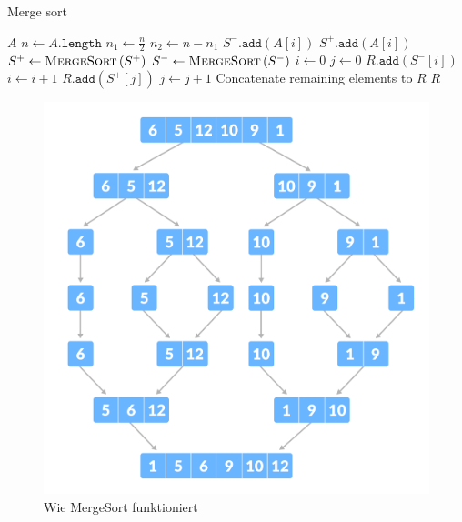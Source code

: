 \documentclass[a4paper]{article}
\begin{document}
        \begin{algorithm}[h]
            \caption{Merge sort}
            \label{alg:MergeSort}
            \begin{algorithmic}
              \State \Return $A$
              \EndIf
              \State $n \gets A\texttt{.length}$
              \State $n_1 \gets \frac n2$
              \State $n_2 \gets n-n_1$
              \State $S^-\texttt{.add}\left(A\left[i\right]\right)$
              \Else
              \State $S^+\texttt{.add}\left(A\left[i\right]\right)$
              \EndIf
              \EndFor
              \State $S^+ \gets \textsc{MergeSort}\left(S^+\right)$
              \State $S^- \gets \textsc{MergeSort}\left(S^-\right)$
              \State $i\gets 0$ 
              \State $j\gets 0$
              \State $R\texttt{.add}\left(S^-\left[i\right]\right)$
              \State $i \gets i+1$
              \Else
              \State $R\texttt{.add}\left(S^+\left[j\right]\right)$
              \State $j \gets j+1$
              \EndIf
              \EndWhile
              \State Concatenate remaining elements to $R$
              \State \Return $R$
              \EndFunction
            \end{algorithmic}
            \end{algorithm}

    \begin{figure}[h]
        \centering
        \includegraphics[scale = 0.203]{Pictures/merge-sort-example_0.png} %
        \caption{Wie MergeSort funktioniert}
        \label{fig:MergeSort}
    \end{figure}
        
\end{document}
